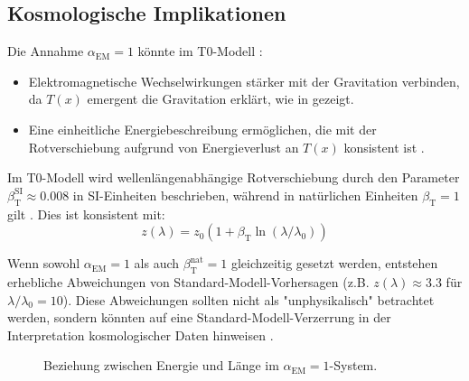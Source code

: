 \documentclass[12pt,a4paper]{article}
\newcommand{\Tfield}{T(x)}
\newcommand{\alphaEM}{\alpha_{\text{EM}}}
\newcommand{\betaT}{\beta_{\text{T}}}
\begin{document}
	\subsection{Kosmologische Implikationen}
	\label{subsec:cosmological_implications}
	
	Die Annahme \(\alphaEM = 1\) könnte im T0-Modell \cite{pascher_galaxies_2025}:
	\begin{itemize}
		\item Elektromagnetische Wechselwirkungen stärker mit der Gravitation verbinden, da \(\Tfield\) emergent die Gravitation erklärt, wie in \cite{pascher_emergente_gravitation_2025} gezeigt.
		\item Eine einheitliche Energiebeschreibung ermöglichen, die mit der Rotverschiebung aufgrund von Energieverlust an \(\Tfield\) konsistent ist \cite{pascher_messdifferenzen_2025}.
	\end{itemize}
	
	Im T0-Modell wird wellenlängenabhängige Rotverschiebung durch den Parameter \(\betaT^{\text{SI}} \approx 0.008\) in SI-Einheiten beschrieben, während in natürlichen Einheiten \(\betaT = 1\) gilt \cite{pascher_params_2025}. Dies ist konsistent mit:
	\begin{equation}
		\label{eq:wavelength_redshift}
		z(\lambda) = z_0 (1 + \betaT \ln(\lambda/\lambda_0))
	\end{equation}
	
	Wenn sowohl \(\alphaEM = 1\) als auch \(\betaT^{\text{nat}} = 1\) gleichzeitig gesetzt werden, entstehen erhebliche Abweichungen von Standard-Modell-Vorhersagen (z.B. \(z(\lambda) \approx 3.3\) für \(\lambda/\lambda_0 = 10\)). Diese Abweichungen sollten nicht als "unphysikalisch" betrachtet werden, sondern könnten auf eine Standard-Modell-Verzerrung in der Interpretation kosmologischer Daten hinweisen \cite{pascher_alphabeta_2025}.
	
	\begin{figure}[h]
		\centering
		\caption{Beziehung zwischen Energie und Länge im \(\alphaEM = 1\)-System.}
		\label{fig:energy_length}
	\end{figure}
	
\end{document}
